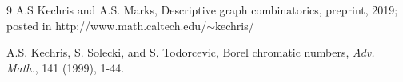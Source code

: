 \documentclass[10pt,a4paper]{article}
\newcommand{\0}{\varnothing}
\begin{document}
\begin{thebibliography}{9}
 A.S Kechris and A.S. Marks, Descriptive graph combinatorics, preprint, 2019; posted in \textnormal{http://www.math.caltech.edu/$\sim$kechris/}

 A.S. Kechris, S. Solecki, and S. Todorcevic, Borel chromatic numbers, \textit{Adv. Math.}, 141 (1999), 1-44.
\end{thebibliography}
\end{document}
